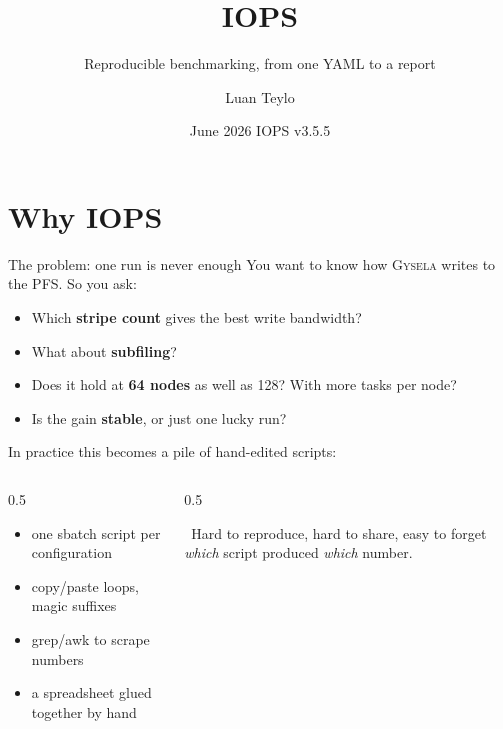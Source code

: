 \documentclass[aspectratio=169,11pt]{beamer}
\title{IOPS}
\subtitle{Reproducible benchmarking, from one YAML to a report}
\date{June 2026 \quad\textperiodcentered\quad IOPS v3.5.5}
\author{Luan Teylo}
\institute{Integrated Orchestration for Parametric Studies}
\newcommand{\code}[1]{{\ttfamily\small\color{iopsNavy}#1}}
\newcommand{\hl}[1]{{\color{iopsPink}\bfseries #1}}
\begin{document}
\maketitle

\section{Why IOPS}

\begin{frame}{The problem: one run is never enough}
  You want to know how \textsc{Gysela} writes to the PFS. So you ask:
  \begin{itemize}
    \item Which \hl{stripe count} gives the best write bandwidth?
    \item What about \hl{subfiling}?
    \item Does it hold at \hl{64 nodes} as well as 128? With more tasks per node?
    \item Is the gain \hl{stable}, or just one lucky run?
  \end{itemize}
  \pause
  \vspace{0.4em}
  In practice this becomes a pile of hand-edited scripts:
  \begin{columns}[T]
    \begin{column}{0.5\textwidth}
      \begin{itemize}
        \item one \code{sbatch} script per configuration
        \item copy/paste loops, magic suffixes
        \item \code{grep}/\code{awk} to scrape numbers
        \item a spreadsheet glued together by hand
      \end{itemize}
    \end{column}
    \begin{column}{0.5\textwidth}
      \begin{keybox}
        \faExclamationTriangle~Hard to reproduce, hard to share, easy to
        forget \emph{which} script produced \emph{which} number.
      \end{keybox}
    \end{column}
  \end{columns}
\end{frame}
\end{document}
